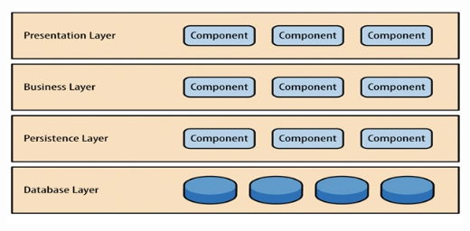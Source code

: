 \documentclass[a4paper,12pt]{article}
\begin{document}
\includegraphics{Design Pattern 2.png}
\end{document}
